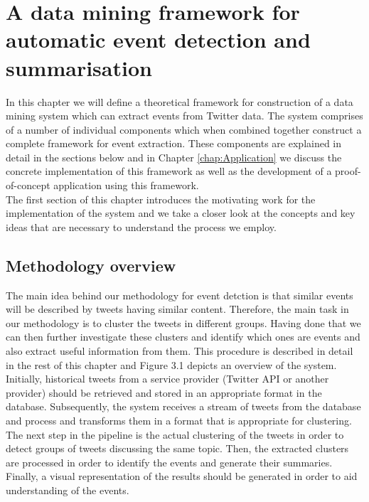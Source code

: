 \chapter{A data mining framework for automatic event detection and summarisation}
\ifpdf
    \graphicspath{{Chapter2/Chapter2Figs/PNG/}{Chapter2/Chapter2Figs/PDF/}{Chapter2/Chapter2Figs/}}
\else
    \graphicspath{{Chapter2/Chapter2Figs/EPS/}{Chapter2/Chapter2Figs/}}
\fi

In this chapter we will define a theoretical framework for construction of a 
data mining system which can extract events from Twitter data. The system comprises of a number
of individual components which when combined together construct a complete framework for 
event extraction. These components are explained in detail in the sections below and in 
Chapter \ref{chap:Application} we discuss the concrete implementation of this framework as 
well as the development of a proof-of-concept application using this framework.\\
The first section of this chapter introduces the motivating work for the implementation of the system
and we take a closer look at the concepts and key ideas that are necessary to understand the process we employ.

\section{Methodology overview}\label{MethodologyOverview}
The main idea behind our methodology for event detction is that similar events will be described by tweets having similar
content. Therefore, the main task in our methodology is to cluster the tweets in different groups. Having done that
we can then further investigate these clusters and identify which ones are events and also extract useful information from them.
This procedure is described in detail in the rest of this chapter and Figure 3.1 depicts an overview of the system. 
Initially, historical tweets from a service provider (Twitter API or another provider) should be retrieved and stored in an 
appropriate format in the database. Subsequently, the system receives a stream of tweets from the database and process and 
transforms them in a format that is appropriate for clustering. The next step in the pipeline is the actual clustering of the tweets 
in order to detect groups of tweets discussing the same topic. Then, the extracted clusters are processed in order to identify the events 
and generate their summaries. Finally, a visual representation of the results should be generated in order to aid understanding of the events.\\

